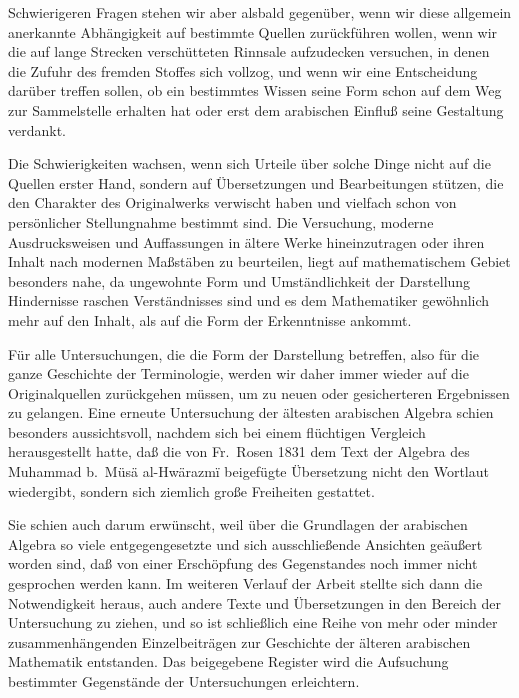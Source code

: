 \documentclass[11pt,a4paper]{article}
\begin{document}
Schwierigeren Fragen stehen wir aber alsbald gegen\"uber, wenn wir diese allgemein anerkannte Abh\"angigkeit auf bestimmte Quellen zur\"uckf\"uhren wollen, wenn wir die auf lange Strecken versch\"utteten Rinnsale aufzudecken versuchen, in denen die Zufuhr des fremden Stoffes sich vollzog, und wenn wir eine Entscheidung dar\"uber treffen sollen, ob ein bestimmtes Wissen seine Form schon auf dem Weg zur Sammelstelle erhalten hat oder erst dem arabischen Einflu\ss{} seine Gestaltung verdankt.

Die Schwierigkeiten wachsen, wenn sich Urteile \"uber solche Dinge nicht auf die Quellen erster Hand, sondern auf \"Ubersetzungen und Bearbeitungen st\"utzen, die den Charakter des Originalwerks verwischt haben und vielfach schon von pers\"onlicher Stellungnahme bestimmt sind. Die Versuchung, moderne Ausdrucksweisen und Auffassungen in \"altere Werke hineinzutragen oder ihren Inhalt nach modernen Ma\ss{}st\"aben zu beurteilen, liegt auf mathematischem Gebiet besonders nahe, da ungewohnte Form und Umst\"andlichkeit der Darstellung Hindernisse raschen Verst\"andnisses sind und es dem Mathematiker gew\"ohnlich mehr auf den Inhalt, als auf die Form der Erkenntnisse ankommt.

F\"ur alle Untersuchungen, die die Form der Darstellung betreffen, also f\"ur die ganze Geschichte der Terminologie, werden wir daher immer wieder auf die Originalquellen zur\"uckgehen m\"ussen, um zu neuen oder gesicherteren Ergebnissen zu gelangen. Eine erneute Untersuchung der \"altesten arabischen Algebra schien besonders aussichtsvoll, nachdem sich bei einem fl\"uchtigen Vergleich herausgestellt hatte, da\ss{} die von Fr.\ Rosen 1831 dem Text der Algebra des Muhammad b.\ M\"us\"a al-Hw\"arazm\"{i} beigef\"ugte \"Ubersetzung nicht den Wortlaut wiedergibt, sondern sich ziemlich gro\ss{}e Freiheiten gestattet.

Sie schien auch darum erw\"unscht, weil \"uber die Grundlagen der arabischen Algebra so viele entgegengesetzte und sich ausschlie\ss{}ende Ansichten ge\"au\ss{}ert worden sind, da\ss{} von einer Ersch\"opfung des Gegenstandes noch immer nicht gesprochen werden kann. Im weiteren Verlauf der Arbeit stellte sich dann die Notwendigkeit heraus, auch andere Texte und \"Ubersetzungen in den Bereich der Untersuchung zu ziehen, und so ist schlie\ss{}lich eine Reihe von mehr oder minder zusammenh\"angenden Einzelbeitr\"agen zur Geschichte der \"alteren arabischen Mathematik entstanden. Das beigegebene Register wird die Aufsuchung bestimmter Gegenst\"ande der Untersuchungen erleichtern.
\end{document}

